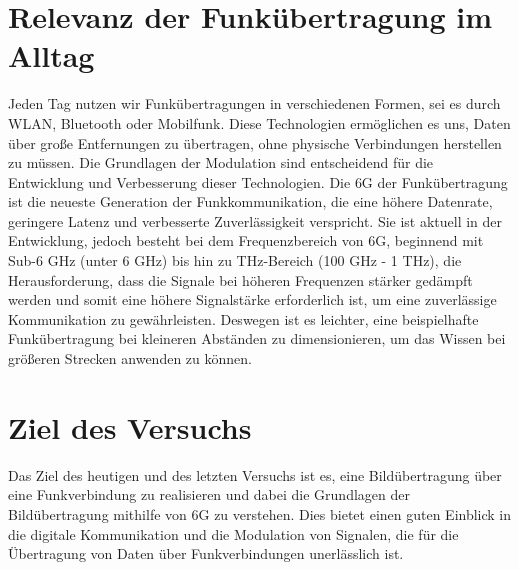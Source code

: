\section{Relevanz der Funkübertragung im Alltag}
Jeden Tag nutzen wir Funkübertragungen in verschiedenen Formen, sei es durch WLAN, Bluetooth oder Mobilfunk. Diese Technologien ermöglichen es uns, Daten über große Entfernungen zu übertragen, ohne physische Verbindungen herstellen zu müssen. Die Grundlagen der Modulation sind entscheidend für die Entwicklung und Verbesserung dieser Technologien.
Die \ac{6G} der Funkübertragung ist die neueste Generation der Funkkommunikation, die eine höhere Datenrate, geringere Latenz und verbesserte Zuverlässigkeit verspricht. Sie ist aktuell in der Entwicklung, 
jedoch besteht bei dem Frequenzbereich von \ac{6G}, beginnend mit Sub-6 GHz (unter 6 GHz) bis hin zu THz-Bereich (100 GHz - 1 THz), 
die Herausforderung, dass die Signale bei höheren Frequenzen stärker gedämpft werden und somit eine höhere Signalstärke erforderlich ist, um eine zuverlässige Kommunikation zu gewährleisten.
Deswegen ist es leichter, eine beispielhafte Funkübertragung bei kleineren Abständen zu dimensionieren, um das Wissen bei größeren Strecken anwenden zu können.
\section{Ziel des Versuchs}
Das Ziel des heutigen und des letzten Versuchs ist es, eine Bildübertragung über eine Funkverbindung zu realisieren und dabei die Grundlagen der Bildübertragung mithilfe von 6G zu verstehen.
Dies bietet einen guten Einblick in die digitale Kommunikation und die Modulation von Signalen, die für die Übertragung von Daten über Funkverbindungen unerlässlich ist.
\clearpage